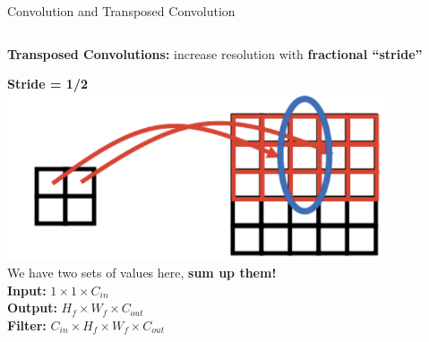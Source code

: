 \documentclass[serif, aspectratio=169]{beamer}
\begin{document}
\begin{frame}{Convolution and Transposed Convolution}
\begin{columns}[T]
    \begin{column}{0.5\textwidth}
        \textbf{Transposed Convolutions:} increase resolution with \textbf{fractional ``stride''}\\
        \begin{center}
            \textbf{Stride = 1/2}\\
            \includegraphics[width=0.85\textwidth]{pic/Conv vs Transpose Conv2.png}\\ 
              \textcolor{deepblue}{We have two sets of values here,} \textbf{\textcolor{deepblue}{sum up them!}}\\
            \vspace{0.2cm}
            \textbf{Input:} \( 1 \times 1 \times C_{in} \) \\
            \textbf{Output:} \( H_f \times W_f \times C_{out} \) \\
            \textbf{Filter:} \( C_{in} \times H_f \times W_f \times C_{out} \)
        \end{center}
    \end{column}

\end{columns}

\end{frame}
\end{document}

